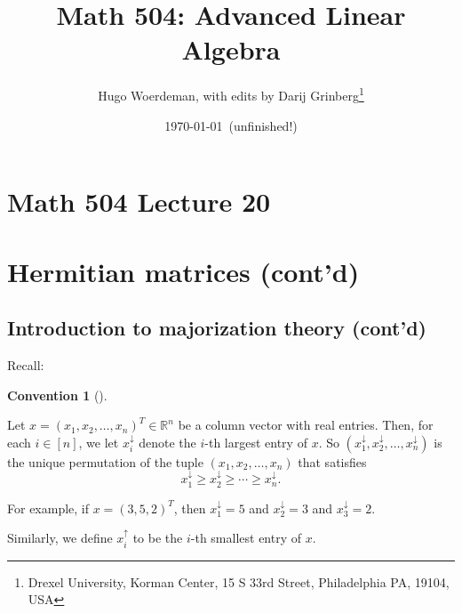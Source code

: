 \documentclass[numbers=enddot,12pt,final,onecolumn,notitlepage]{scrartcl}%
\numberwithin{exer}{subsection}
\theoremstyle{definition}
\newtheorem{conv}[theo]{Convention}
\newenvironment{convention}[1][]
{\begin{conv}[#1]\begin{leftbar}}
{\end{leftbar}\end{conv}}
\begin{document}
\title{Math 504: Advanced Linear Algebra}
\author{Hugo Woerdeman, with edits by Darij Grinberg\thanks{Drexel University, Korman
Center, 15 S 33rd Street, Philadelphia PA, 19104, USA}}
\date{\today\ (unfinished!)}
\maketitle
\tableofcontents

\section*{Math 504 Lecture 20}

\section{Hermitian matrices (cont'd)}

\subsection{Introduction to majorization theory (cont'd)}

Recall:

\begin{convention}
Let $x=\left(  x_{1},x_{2},\ldots,x_{n}\right)  ^{T}\in\mathbb{R}^{n}$ be a
column vector with real entries. Then, for each $i\in\left[  n\right]  $, we
let $x_{i}^{\downarrow}$ denote the $i$-th largest entry of $x$. So $\left(
x_{1}^{\downarrow},x_{2}^{\downarrow},\ldots,x_{n}^{\downarrow}\right)  $ is
the unique permutation of the tuple $\left(  x_{1},x_{2},\ldots,x_{n}\right)
$ that satisfies
\[
x_{1}^{\downarrow}\geq x_{2}^{\downarrow}\geq\cdots\geq x_{n}^{\downarrow}.
\]

\end{convention}

For example, if $x=\left(  3,5,2\right)  ^{T}$, then $x_{1}^{\downarrow}=5$
and $x_{2}^{\downarrow}=3$ and $x_{3}^{\downarrow}=2$.

Similarly, we define $x_{i}^{\uparrow}$ to be the $i$-th smallest entry of $x$.
\end{document}
